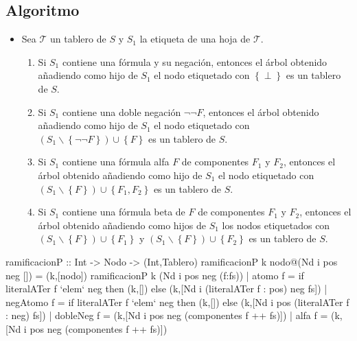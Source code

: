 \documentclass{beamer}
\begin{document}
\subsection{Algoritmo}
\begin{frame}
\begin{itemize}
\item Sea $\mathcal{T}$ un tablero de $S$ y $S_1$ la etiqueta de
  una hoja  de $\mathcal{T}$.
  \begin{enumerate}
  \item Si $S_1$ contiene una fórmula y su negación, entonces el árbol
    obtenido añadiendo como hijo de $S_1$ el nodo etiquetado con
    $\left\{ \perp \right\}$ es un tablero de $S$.
  \item Si $S_1$ contiene una doble negación $\neg \neg F$, entonces
    el árbol obtenido añadiendo como hijo de $S_1$ el nodo etiquetado
    con $(S_1 \backslash \left\{\neg \neg F \right\})\cup \left\{ F \right\}$
    es un tablero de $S$.
  \item Si $S_1$ contiene una fórmula alfa $F$ de componentes $F_1$ y $F_2$,
    entonces el árbol obtenido añadiendo como hijo de $S_1$ el nodo etiquetado
    con $(S_1 \backslash \left\{ F \right\})\cup \left\{ F_1,F_2 \right\}$
    es un tablero de $S$.
  \item Si $S_1$ contiene una fórmula beta de $F$ de componentes $F_1$ y $F_2$,
    entonces el árbol obtenido añadiendo como hijos de $S_1$ los nodos
    etiquetados con $(S_1 \backslash \left\{ F \right\}) \cup \left\{ F_1 \right\}$ y
    $(S_1 \backslash \left\{ F \right\})\cup \left\{ F_2 \right\}$ es un tablero
    de $S$.
  \end{enumerate}
\end{itemize}  
\end{frame}

\begin{frame}[fragile]
\begin{code}
ramificacionP :: Int -> Nodo -> (Int,Tablero)
ramificacionP k nodo@(Nd i pos neg []) = (k,[nodo])
ramificacionP k (Nd i pos neg (f:fs))
  | atomo    f = 
      if literalATer f `elem` neg
      then (k,[])
      else (k,[Nd i (literalATer f : pos) neg fs])
  | negAtomo f = 
      if literalATer f `elem` neg
      then (k,[]) 
      else (k,[Nd i pos (literalATer f : neg) fs])
  | dobleNeg f = 
      (k,[Nd i pos neg (componentes f ++ fs)])
  | alfa     f = 
      (k,[Nd i pos neg (componentes f ++ fs)])
\end{code}  
\end{frame}
\end{document}
